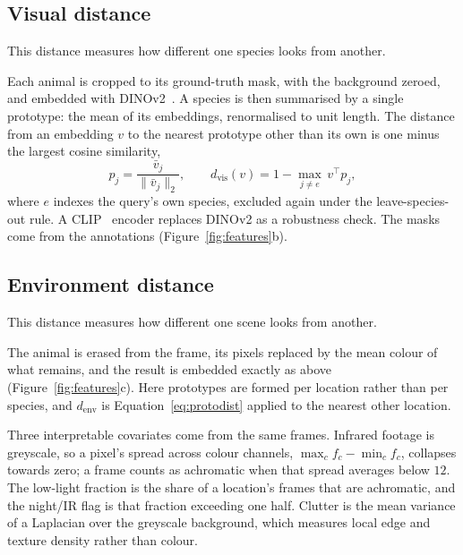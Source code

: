 \subsection{Visual distance}
This distance measures how different one species looks from another.

Each animal is cropped to its ground-truth mask, with the background zeroed, and embedded with
DINOv2~\cite{dinov2}. A species is then summarised by a single prototype: the mean of its embeddings,
renormalised to unit length. The distance from an embedding $v$ to the nearest prototype other than its own is
one minus the largest cosine similarity,
\begin{equation}
  p_j=\frac{\bar v_j}{\lVert \bar v_j\rVert_2},
  \qquad
  d_{\mathrm{vis}}(v)=1-\max_{j\neq e}\, v^{\!\top}p_j ,
  \label{eq:protodist}
\end{equation}
where $e$ indexes the query's own species, excluded again under the leave-species-out rule. A
CLIP~\cite{clip} encoder replaces DINOv2 as a robustness check. The masks come from the annotations
(Figure~\ref{fig:features}b).

\subsection{Environment distance}
This distance measures how different one scene looks from another.

The animal is erased from the frame, its pixels replaced by the mean colour of what remains, and the result is
embedded exactly as above (Figure~\ref{fig:features}c). Here prototypes are formed per location rather than per
species, and $d_{\mathrm{env}}$ is Equation~\ref{eq:protodist} applied to the nearest other location.

Three interpretable covariates come from the same frames. Infrared footage is greyscale, so a pixel's spread
across colour channels, $\max_c f_c-\min_c f_c$, collapses towards zero; a frame counts as achromatic when that
spread averages below $12$. The low-light fraction is the share of a location's frames that are achromatic, and
the night/IR flag is that fraction exceeding one half. Clutter is the mean variance of a Laplacian over the
greyscale background, which measures local edge and texture density rather than colour.

